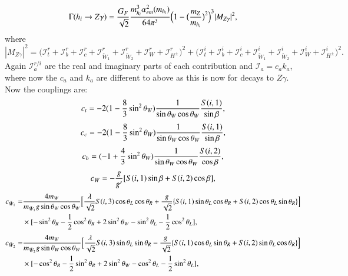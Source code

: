 \documentclass[final,3p,times,pdflatex]{elsarticle}
\begin{document}
\begin{equation} \label{hZgamNMSSM}
\Gamma (h_{i} \rightarrow Z \gamma) = {G_{F} \over \sqrt{2}} {m_{h_i}^3 \alpha_{em}^2 (m_{h_i}) \over 64 \pi^3} \Big(1 - \big({m_{Z} \over m_{h_i}}\big)^2\Big)^3 |M_{Z \gamma}|^2,
\end{equation}
where
\begin{equation}
|M_{Z \gamma}|^2 = \Big(\mathcal{I}_{t}^{r} + \mathcal{I}_{b}^{r} + \mathcal{I}_{c}^{r} + \mathcal{I}_{\tilde{W}_1}^{r} + \mathcal{I}_{\tilde{W}_2}^{r} + \mathcal{I}_{W}^{r} + \mathcal{I}_{H^{\pm}}^{r}\Big)^2 + \Big(\mathcal{I}_{t}^{i} + \mathcal{I}_{b}^{i} + \mathcal{I}_{c}^{i} + \mathcal{I}_{\tilde{W}_1}^{i} + \mathcal{I}_{\tilde{W}_2}^{i} + \mathcal{I}_{W}^{i} + \mathcal{I}_{H^{\pm}}^{i}\Big)^2.
\end{equation}
Again $\mathcal{I}_{a}^{r/i}$ are the real and imaginary parts of each contribution and $\mathcal{I}_{a} = c_{a} k_{a}$, where now the $c_{a}$ and $k_{a}$ are different to above as this is now for decays to $Z \gamma$.
Now the couplings are:
\begin{equation}
c_{t} = -2(1-{8 \over 3}\sin^2 \theta_W){1 \over \sin\theta_W \cos\theta_W}{S(i,1) \over \sin\beta},
\end{equation}
\begin{equation}
c_{c} = -2(1-{8 \over 3}\sin^2 \theta_W){1 \over \sin\theta_W \cos\theta_W}{S(i,1) \over \sin\beta},
\end{equation}
\begin{equation}
c_{b} = (-1+{4 \over 3}\sin^2 \theta_W){1 \over \sin\theta_W \cos\theta_W}{S(i,2) \over \cos\beta},
\end{equation}
\begin{equation}
c_{W} = -{g \over g'} [S(i,1)\sin\beta + S(i,2)\cos\beta],
\end{equation}
\begin{equation}
\begin{aligned}
c_{\tilde{W}_1} = & {4 m_{W} \over m_{\tilde{W}_1} g \sin\theta_W \cos\theta_W}\Big[ {\lambda \over \sqrt{2}} S(i,3) \cos\theta_L \cos\theta_R + {g \over \sqrt{2}}\{S(i,1)\sin\theta_L \cos\theta_R + S(i,2)\cos\theta_L \sin\theta_R\}\Big] \\ & \times [-\sin^2 \theta_R - {1 \over 2} \cos^2 \theta_R + 2 \sin^2 \theta_W - \sin^2 \theta_L - {1 \over 2}\cos^2 \theta_L],
\end{aligned}
\end{equation}
\begin{equation}
\begin{aligned}
c_{\tilde{W}_2} = & {4 m_{W} \over m_{\tilde{W}_2} g \sin\theta_W \cos\theta_W}\Big[ {\lambda \over \sqrt{2}} S(i,3) \sin\theta_L \sin\theta_R - {g \over \sqrt{2}}\{S(i,1)\cos\theta_L \sin\theta_R + S(i,2)\sin\theta_L \cos\theta_R\}\Big]\\ & \times [-\cos^2 \theta_R - {1 \over 2} \sin^2 \theta_R + 2 \sin^2 \theta_W - \cos^2 \theta_L - {1 \over 2}\sin^2 \theta_L],
\end{aligned}
\end{equation}
\end{document}
